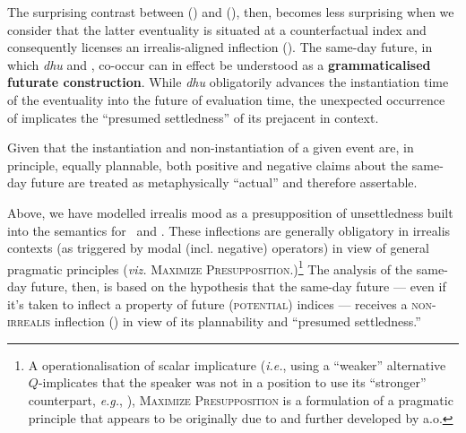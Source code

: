 The surprising contrast between () and (), then, becomes less surprising when we consider that the latter eventuality is situated at a counterfactual index and consequently licenses an irrealis-aligned inflection (\II). The same-day future, in which \textit{dhu} and \I{}, co-occur can in effect be understood as a \textbf{grammaticalised futurate construction}. While \textit{dhu} obligatorily advances the instantiation time of the eventuality into the future of evaluation time, the unexpected occurrence of \I{} implicates the ``presumed settledness'' of its prejacent in context.

 Given that the instantiation and non-instantiation of a given event are, in principle, equally plannable, both positive and negative claims about the same-day future are treated as metaphysically ``actual'' and therefore assertable.

Above, we have modelled irrealis mood as a presupposition of unsettledness built into the semantics for \II~and \IV. These inflections are generally obligatory in irrealis contexts (as triggered by modal (incl. negative) operators) in view of general pragmatic principles (\textit{viz.} \textsc{Maximize Presupposition.)}\footnote{A operationalisation of scalar implicature (\textit{i.e.}, using a ``weaker'' alternative $ Q $-implicates that the speaker was not in a position to use its ``stronger'' counterpart,\textit{ e.g.}, \citealt{Horn1984}), \textsc{Maximize Presupposition} is a formulation of a pragmatic principle that appears to be originally due to \citet{Heim1991} and further developed by \citet{Sauerland2009,Percus2006} a.o.} The analysis of the same-day future, then, is based on the hypothesis that the same-day future --- even if it's taken to inflect a property of future (\textsc{potential}) indices --- receives a \textsc{non-irrealis} inflection (\I{}) in view of its plannability and ``presumed settledness.'' 



